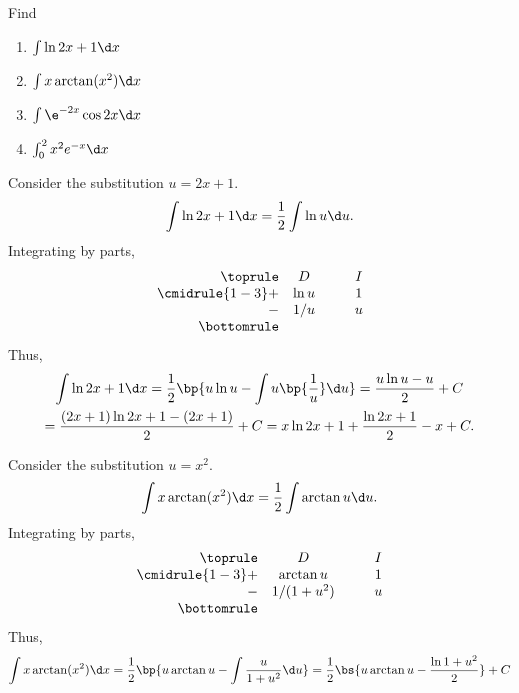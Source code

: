 \begin{problem}
    Find        
    \begin{enumerate}
        \item $\int \ln{2x+1} \d x$
        \item $\int x \arctan(x^2) \d x$
        \item $\int \e^{-2x}\cos2x \d x$
        \item $\int_0^2 x^2e^{-x} \d x$
    \end{enumerate}
\end{problem}
\begin{solution}
    \begin{ppart}
        Consider the substitution $u = 2x + 1$. \[\int \ln{2x + 1} \d x = \frac12 \int \ln u \d u.\] Integrating by parts,
        \[
            \begin{array}{r c @{\hspace*{1.0cm}} c}\toprule
                & D & I \\\cmidrule{1-3}
                + & \ln u & 1 \\
                - & 1/u & u \\\bottomrule
            \end{array}
        \]
        Thus, 
        \begin{gather*}
            \int \ln{2x + 1} \d x = \frac12 \bp{u\ln u - \int u \bp{\frac{1}{u}} \d u} = \frac{u\ln u - u}2 + C\\
            = \frac{(2x + 1)\ln{2x+1} - (2x+1)}2 + C = x\ln{2x+1} + \frac{\ln{2x+1}}2 - x + C.
        \end{gather*}
    \end{ppart}
    \begin{ppart}
        Consider the substitution $u = x^2$. \[\int x \arctan(x^2) \d x = \frac12 \int \arctan u \d u.\] Integrating by parts, 
        \[
            \begin{array}{r c @{\hspace*{1.0cm}} c}\toprule
                & D & I \\\cmidrule{1-3}
                + & \arctan u & 1 \\
                - & 1/(1 + u^2) & u \\\bottomrule
            \end{array}
        \]
        Thus,
        \begin{gather*}
            \int x \arctan(x^2) \d x = \frac12 \bp{u \arctan u - \int \frac{u}{1 + u^2} \d u} = \frac12 \bs{u \arctan u - \frac{\ln{1 + u^2}}2} + C\\

\end{gather*}
\end{ppart}
\end{solution}

